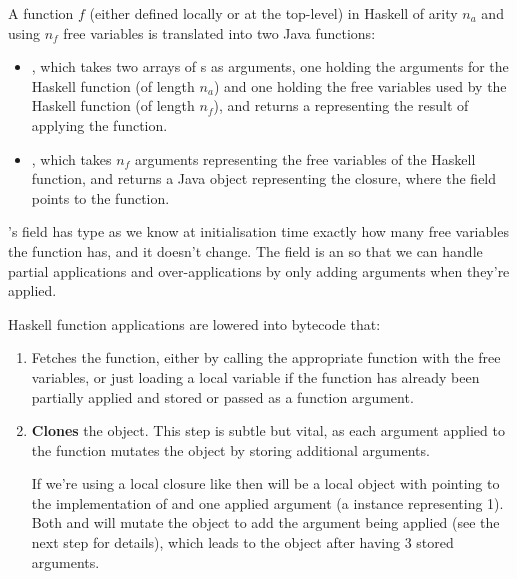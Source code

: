 \documentclass[dissertation.tex]{subfiles}
\begin{document}
{{{            A function \(f\) (either defined locally or at the top-level) in Haskell of arity \(n_a\) and using \(n_f\) free variables is translated into two Java functions:
            
            \begin{itemize}
            \item
            {
                , which takes two arrays of s as arguments, one holding the arguments for the Haskell function (of length \(n_a\)) and one holding the free variables used by the Haskell function (of length \(n_f\)), and returns a  representing the result of applying the function.
            }
            \item
            {
                , which takes \(n_f\) arguments representing the free variables of the Haskell function, and returns a Java  object representing the closure, where the  field points to the  function.
            }
            \end{itemize}
            
            's  field has type  as we know at initialisation time exactly how many free variables the function has, and it doesn't change. The  field is an  so that we can handle partial applications and over-applications by only adding arguments when they're applied.

            Haskell function applications are lowered into bytecode that:
            \begin{enumerate}
            \item
            {
                Fetches the function, either by calling the appropriate  function with the free variables, or just loading a local variable if the function has already been partially applied and stored or passed as a function argument.
            }
            \item
            {
                \textbf{Clones} the  object. This step is subtle but vital, as each argument applied to the function mutates the  object by storing additional arguments.
                
                If we're using a local closure like  then  will be a local  object with  pointing to the implementation of \haskell{(+)} and one applied argument (a  instance representing 1). Both  and  will mutate the object to add the argument being applied (see the next step for details), which leads to the  object after  having 3 stored arguments.

}
\end{enumerate}}}}
\end{document}
